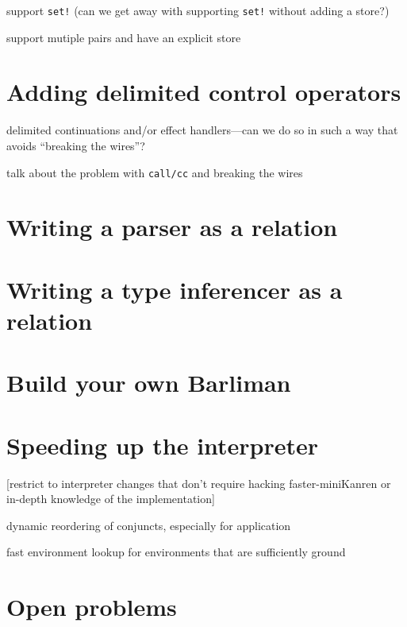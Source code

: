 \documentclass{book}
\begin{document}
support \verb|set!| (can we get away with supporting \verb|set!| without adding a store?)

support mutiple pairs and have an explicit store


\chapter{Adding delimited control operators}%

delimited continuations and/or effect handlers---can we do so in such a way that avoids ``breaking the wires''?

talk about the problem with \verb|call/cc| and breaking the wires



\chapter{Writing a parser as a relation}%


\chapter{Writing a type inferencer as a relation}%


\chapter{Build your own Barliman}%


\chapter{Speeding up the interpreter}%

[restrict to interpreter changes that don't require hacking faster-miniKanren or in-depth knowledge of the implementation]

dynamic reordering of conjuncts, especially for application

fast environment lookup for environments that are sufficiently ground


\chapter{Open problems}%


\appendix
\end{document}
